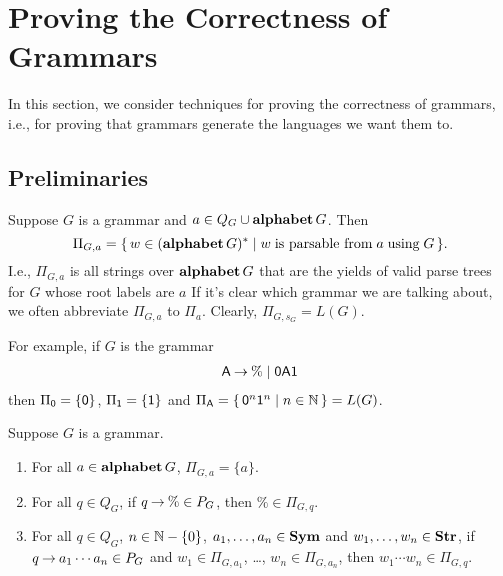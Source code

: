 \section{Proving the Correctness of Grammars}
\label{ProvingTheCorrectnessOfGrammars}


In this section, we consider techniques for proving the correctness of
grammars, i.e., for proving that grammars generate the languages we want
them to.

\subsection{Preliminaries}

Suppose $G$ is a grammar and $a\in Q_G\cup\mathbf{alphabet}\,G$.  Then
%
%
\begin{displaymath}
\Pi_{G,a}=\{ \, w\in(\mathbf{alphabet}\,G)^* \mid w \;\allowbreak\mbox{is parsable from}\allowbreak\; a
  \;\allowbreak\mbox{using}\allowbreak\; G \, \} .  
\end{displaymath}
I.e., $\Pi_{G,a}$ is all strings over $\mathbf{alphabet}\,G$ that are the
yields of valid parse trees for $G$ whose root labels are $a$ If it's
clear which grammar we are talking about, we often abbreviate
$\Pi_{G,a}$ to $\Pi_a$.  Clearly, $\Pi_{G,s_G} = L(G)$.

For example, if $G$ is the grammar
\begin{gather*}
  \mathsf{A} \mathbin{\to} \% \mid \mathsf{0}\mathsf{A}\mathsf{1}
\end{gather*}
then $\Pi_{\mathsf{0}}=\{\mathsf{0}\}$, $\Pi_{\mathsf{1}}=\{\mathsf{1}\}$ and $\Pi_{\mathsf{A}}=
\{ \, \mathsf{0}^n\mathsf{1}^n \mid n\in\mathbb{N} \, \}= L(G)$.

\begin{proposition}
\label{PiProp}
Suppose $G$ is a grammar.
\begin{enumerate}[\quad(1)]
\item For all $a\in\mathbf{alphabet}\,G$, $\Pi_{G,a}=\{a\}$.

\item For all $q\in Q_G$, if $q\mathbin{\to}\%\in P_G$, then
  ${\%}\in\Pi_{G,q}$.

\item For all $q\in Q_G$, $n\in\mathbb{N}-\{0\}$, $a_1,\ldots,a_n\in\mathbf{Sym}$
  and $w_1,\ldots,w_n\in\mathbf{Str}$, if $q\mathbin{\to} a_1\cdots a_n\in P_G$ and
  $w_1\in\Pi_{G,a_1}$, \ldots, $w_n\in\Pi_{G,a_n}$, then
  ${w_1\cdots w_n}\in\Pi_{G,q}$.
\end{enumerate}
\end{proposition}

